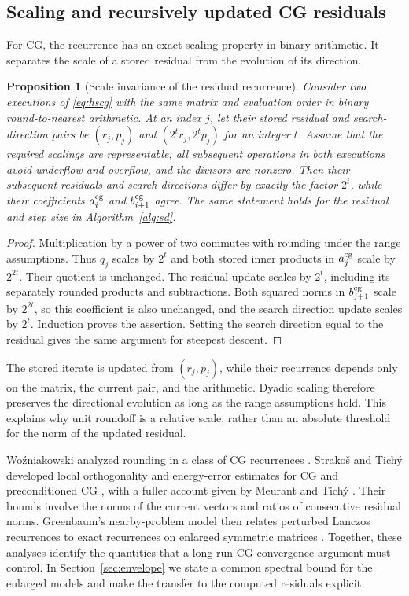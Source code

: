 \documentclass[11pt]{article}
\newtheorem{proposition}{Proposition}
\theoremstyle{definition}
\begin{document}
\subsection{Scaling and recursively updated CG residuals}
\label{sec:cg-residual}

For CG, the recurrence has an exact scaling property in binary arithmetic.
It separates the scale of a stored residual from the evolution of its
direction.

\begin{proposition}[Scale invariance of the residual recurrence]
\label{prop:scale-invariance}
Consider two executions of \eqref{eq:hscg} with the same matrix and
evaluation order in binary round-to-nearest arithmetic.  At an index
$j$, let their stored residual and search-direction pairs be
$(r_j,p_j)$ and $(2^t r_j,2^t p_j)$ for an integer $t$.
Assume that the required scalings are representable, all subsequent
operations in both executions avoid underflow and overflow, and the
divisors are nonzero.  Then their subsequent residuals and search
directions differ by exactly the factor $2^t$, while their coefficients
$a_i^{\rm cg}$ and $b_{i+1}^{\rm cg}$ agree.  The same statement holds
for the residual and step size in Algorithm~\ref{alg:sd}.
\end{proposition}

\begin{proof}
Multiplication by a power of two commutes with rounding under the range
assumptions.  Thus $q_j$ scales by $2^t$ and both stored inner products
in $a_j^{\rm cg}$ scale by $2^{2t}$.  Their quotient is unchanged.
The residual update scales by $2^t$, including its separately rounded
products and subtractions.  Both squared norms in $b_{j+1}^{\rm cg}$
scale by $2^{2t}$, so this coefficient is also unchanged, and the search
direction update scales by $2^t$.  Induction proves the assertion.
Setting the search direction equal to the residual gives the same
argument for steepest descent.
\end{proof}

The stored iterate is updated from $(r_j,p_j)$, while their recurrence
depends only on the matrix, the current pair, and the arithmetic.
Dyadic scaling therefore preserves the directional evolution as long as
the range assumptions hold.  This explains why unit roundoff is a
relative scale, rather than an absolute threshold for the norm of the
updated residual.

Wo\'zniakowski analyzed rounding in a class of CG recurrences
\cite{Wozniakowski1980}.  Strako\v{s} and Tich\'y developed local
orthogonality and energy-error estimates for CG and preconditioned CG
\cite{StrakosTichy2002,StrakosTichy2005}, with a fuller account given by
Meurant and Tich\'y \cite{MeurantTichy2024}.  Their bounds
involve the norms of the current vectors and ratios of consecutive
residual norms.  Greenbaum's nearby-problem model then relates perturbed
Lanczos recurrences to exact recurrences on enlarged symmetric matrices
\cite{Greenbaum1989}.  Together, these analyses identify the quantities
that a long-run CG convergence argument must control.  In
Section~\ref{sec:envelope} we state a common spectral bound for the
enlarged models and make the transfer to the computed residuals explicit.
\end{document}
